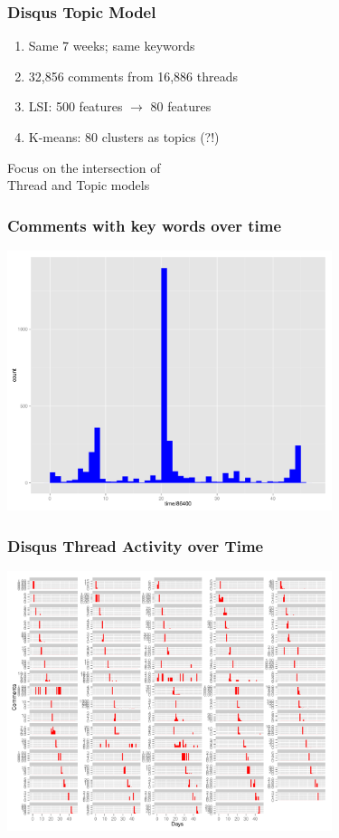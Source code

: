 \documentclass{beamer}
\begin{document}
\begin{frame}\frametitle{Disqus Topic Model}
\begin{center}
{\Large 
\begin{enumerate}
\item Same 7 weeks; same keywords
\item 32,856 comments from 16,886 threads
\item LSI: 500 features $\rightarrow$ 80 features
\item K-means: 80 clusters as topics (?!)
\end{enumerate}
}
\end{center}
\end{frame}

\begin{frame}
\begin{center}
{\Huge Focus on the intersection of \\[15 pt] Thread and Topic models}
\end{center}
\end{frame}

\begin{frame}\frametitle{Comments with key words over time}
  \begin{center}
    \includegraphics[width=9.5cm]{./imgs/time.pdf}
  \end{center}
\end{frame}

\begin{frame}\frametitle{Disqus Thread Activity over Time}
  \begin{center}
    \includegraphics[width=9.5cm]{./imgs/timebythread.pdf}
  \end{center}
\end{frame}
\end{document}
